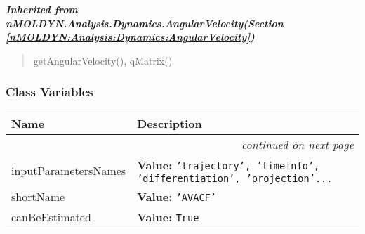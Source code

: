 \large{\textbf{\textit{Inherited from nMOLDYN.Analysis.Dynamics.AngularVelocity\textit{(Section \ref{nMOLDYN:Analysis:Dynamics:AngularVelocity})}}}}

\begin{quote}
getAngularVelocity(), qMatrix()
\end{quote}


  \subsubsection{Class Variables}

    \vspace{-1cm}
\hspace{\varindent}\begin{longtable}{|p{\varnamewidth}|p{\vardescrwidth}|l}
\cline{1-2}
\cline{1-2} \centering \textbf{Name} & \centering \textbf{Description}& \\
\cline{1-2}
\endhead\cline{1-2}\multicolumn{3}{r}{\small\textit{continued on next page}}\\\endfoot\cline{1-2}
\endlastfoot\raggedright i\-n\-p\-u\-t\-P\-a\-r\-a\-m\-e\-t\-e\-r\-s\-N\-a\-m\-e\-s\- & \raggedright \textbf{Value:} 
{\tt 'trajectory', 'timeinfo', 'differentiation', 'projection'\texttt{...}}&\\
\cline{1-2}
\raggedright s\-h\-o\-r\-t\-N\-a\-m\-e\- & \raggedright \textbf{Value:} 
{\tt 'AVACF'}&\\
\cline{1-2}
\raggedright c\-a\-n\-B\-e\-E\-s\-t\-i\-m\-a\-t\-e\-d\- & \raggedright \textbf{Value:} 
{\tt True}&\\
\cline{1-2}
\end{longtable}



